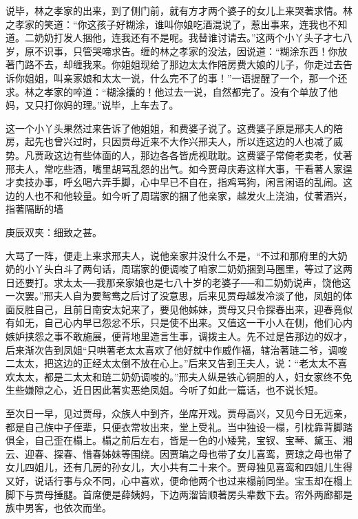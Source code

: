 \begin{parag}
    说毕，林之孝家的出来，到了侧门前，就有方才两个婆子的女儿上来哭著求情。林之孝家的笑道：“你这孩子好糊涂，谁叫你娘吃酒混说了，惹出事来，连我也不知道。二奶奶打发人捆他，连我还有不是呢。我替谁讨请去。”这两个小丫头子才七八岁，原不识事，只管哭啼求告。缠的林之孝家的没法，因说道：“糊涂东西！你放著门路不去，却缠我来。你姐姐现给了那边太太作陪房费大娘的儿子，你走过去告诉你姐姐，叫亲家娘和太太一说，什么完不了的事！”一语提醒了一个，那一个还求。林之孝家的啐道：“糊涂攮的！他过去一说，自然都完了。没有个单放了他妈，又只打你妈的理。”说毕，上车去了。
\end{parag}


\begin{parag}
    这一个小丫头果然过来告诉了他姐姐，和费婆子说了。这费婆子原是邢夫人的陪房，起先也曾兴过时，只因贾母近来不大作兴邢夫人，所以连这边的人也减了威势。凡贾政这边有些体面的人，那边各各皆虎视耽耽。这费婆子常倚老卖老，仗著邢夫人，常吃些酒，嘴里胡骂乱怨的出气。如今贾母庆寿这样大事，干看著人家逞才卖技办事，呼幺喝六弄手脚，心中早已不自在，指鸡骂狗，闲言闲语的乱闹。这边的人也不和他较量。如今听了周瑞家的捆了他亲家，越发火上浇油，仗著酒兴，指著隔断的墙\begin{note}庚辰双夹：细致之甚。\end{note}大骂了一阵，便走上来求邢夫人，说他亲家并没什么不是，“不过和那府里的大奶奶的小丫头白斗了两句话，周瑞家的便调唆了咱家二奶奶捆到马圈里，等过了这两日还要打。求太太──我那亲家娘也是七八十岁的老婆子──和二奶奶说声，饶他这一次罢。”邢夫人自为要鸳鸯之后讨了没意思，后来见贾母越发冷淡了他，凤姐的体面反胜自己，且前日南安太妃来了，要见他姊妹，贾母又只令探春出来，迎春竟似有如无，自己心内早已怨忿不乐，只是使不出来。又值这一干小人在侧，他们心内嫉妒挟怨之事不敢施展，便背地里造言生事，调拨主人。先不过是告那边的奴才，后来渐次告到凤姐“只哄著老太太喜欢了他好就中作威作福，辖治著琏二爷，调唆二太太，把这边的正经太太倒不放在心上。”后来又告到王夫人，说：“老太太不喜欢太太，都是二太太和琏二奶奶调唆的。”邢夫人纵是铁心铜胆的人，妇女家终不免生些嫌隙之心，近日因此著实恶绝凤姐。今听了如此一篇话，也不说长短。
\end{parag}


\begin{parag}
    至次日一早，见过贾母，众族人中到齐，坐席开戏。贾母高兴，又见今日无远亲，都是自己族中子侄辈，只便衣常妆出来，堂上受礼。当中独设一榻，引枕靠背脚踏俱全，自己歪在榻上。榻之前后左右，皆是一色的小矮凳，宝钗、宝琴、黛玉、湘云、迎春、探春、惜春姊妹等围绕。因贾㻞之母也带了女儿喜鸾，贾琼之母也带了女儿四姐儿，还有几房的孙女儿，大小共有二十来个。贾母独见喜鸾和四姐儿生得又好，说话行事与众不同，心中喜欢，便命他两个也过来榻前同坐。宝玉却在榻上脚下与贾母捶腿。首席便是薛姨妈，下边两溜皆顺著房头辈数下去。帘外两廊都是族中男客，也依次而坐。
\end{parag}


